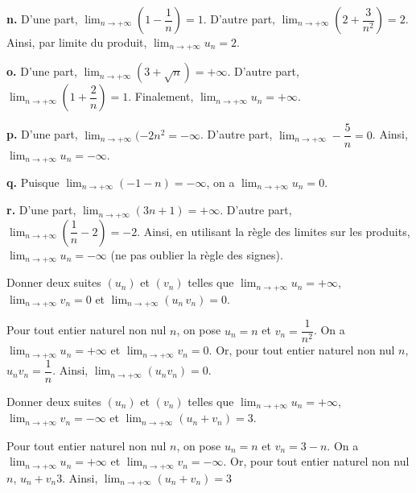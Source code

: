 \documentclass[11pt,fleqn]{book} %
\begin{document}
\begin{solution}
\textbf{n.} D'une part, $\displaystyle\lim _{n\to + \infty} \left( 1-\dfrac{1}{n}\right)=1$. D'autre part, $\displaystyle\lim _{n\to + \infty} \left(2+\dfrac{3}{n^2}\right)=2$. \\Ainsi, par limite du produit, $\displaystyle\lim _{n\to + \infty} u_n=2$.

\textbf{o.} D'une part, $\displaystyle\lim _{n\to + \infty} (3+\sqrt{n})=+\infty$. D'autre part, $\displaystyle\lim _{n\to + \infty} \left(1+\dfrac{2}{n}\right)=1$. Finalement, $\displaystyle\lim _{n\to + \infty}u_n=+\infty $.

\textbf{p.} D'une part, $\displaystyle\lim _{n\to + \infty}(-2n^2=-\infty$. D'autre part, $\displaystyle\lim _{n\to + \infty} -\dfrac{5}{n}=0$. Ainsi, $\displaystyle\lim _{n\to + \infty} u_n=-\infty$.

\textbf{q.} Puisque $\displaystyle\lim _{n\to + \infty}(-1-n)=-\infty$, on a $\displaystyle\lim _{n\to + \infty}u_n=0$.

\textbf{r.} D'une part, $\displaystyle\lim _{n\to + \infty}(3n+1)=+\infty$. D'autre part, $\displaystyle\lim _{n\to + \infty}\left(\dfrac{1}{n}-2\right)=-2$. Ainsi, en utilisant la règle des limites sur les produits, $\displaystyle\lim _{n\to + \infty}u_n=-\infty$ (ne pas oublier la règle des signes).\end{solution}



\begin{exercise}[topic=lim02]Donner deux suites $(u_n)$ et $(v_n)$ telles que $\displaystyle \lim_{n \to +\infty}u_n=+\infty$, $\displaystyle \lim_{n \to +\infty} v_n = 0$ et $\displaystyle \lim_{n \to +\infty} (u_n\,v_n)=0$.\end{exercise}
\begin{solution}Pour tout entier naturel non nul $n$, on pose $u_n=n$ et $v_n=\dfrac{1}{n^2}$. On a $\displaystyle\lim_{n \to+\infty}u_n=+\infty$ et $\displaystyle\lim_{n \to+\infty}v_n=0$. Or, pour tout entier naturel non nul $n$, $u_nv_n=\dfrac{1}{n}$. Ainsi, $\displaystyle\lim_{n \to+\infty}(u_nv_n)=0$.\end{solution}



\begin{exercise}[topic=lim02] Donner deux suites $(u_n)$ et $(v_n)$ telles que $\displaystyle \lim_{n \to +\infty}u_n=+\infty$, $\displaystyle \lim_{n \to +\infty} v_n = -\infty$ et $\displaystyle \lim_{n \to +\infty} (u_n + v_n)=3$.\end{exercise}
\begin{solution}Pour tout entier naturel non nul $n$, on pose $u_n=n$ et $v_n=3-n$. On a $\displaystyle\lim_{n \to+\infty}u_n=+\infty$ et $\displaystyle\lim_{n \to+\infty}v_n=-\infty$. Or, pour tout entier naturel non nul $n$, $u_n+v_n3$. Ainsi, $\displaystyle\lim_{n \to+\infty}(u_n+v_n)=3$\end{solution}
\end{document}
